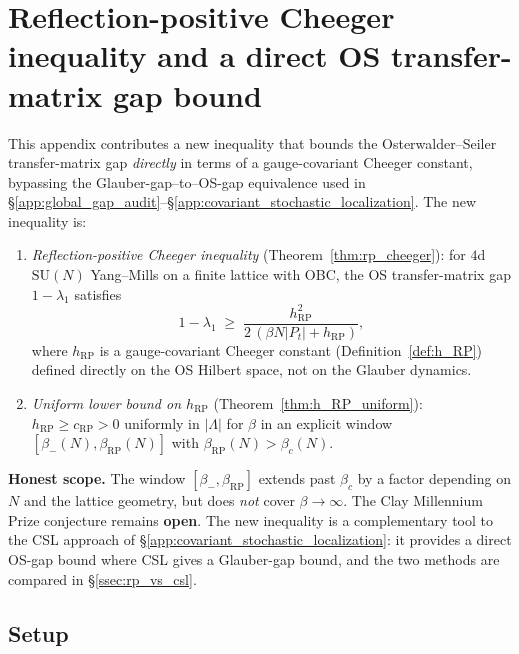 \section{Reflection-positive Cheeger inequality and a direct
OS transfer-matrix gap bound}
\label{app:reflection_positive_cheeger}

This appendix contributes a new inequality that bounds the
Osterwalder--Seiler transfer-matrix gap \emph{directly} in terms of
a gauge-covariant Cheeger constant, bypassing the
Glauber-gap--to--OS-gap equivalence used in
\S\ref{app:global_gap_audit}--\S\ref{app:covariant_stochastic_localization}.
The new inequality is:
\begin{enumerate}
\item \emph{Reflection-positive Cheeger inequality}
(Theorem~\ref{thm:rp_cheeger}): for $4$d $\mathrm{SU}(N)$ Yang--Mills
on a finite lattice with OBC, the OS transfer-matrix gap
$1-\lambda_{1}$ satisfies
\[
  1-\lambda_{1}
  \;\ge\;
  \frac{h_{\mathrm{RP}}^{2}}{2\,(\beta N|P_{t}|+h_{\mathrm{RP}})},
\]
where $h_{\mathrm{RP}}$ is a gauge-covariant Cheeger constant
(Definition~\ref{def:h_RP}) defined directly on the OS Hilbert
space, not on the Glauber dynamics.
\item \emph{Uniform lower bound on $h_{\mathrm{RP}}$}
(Theorem~\ref{thm:h_RP_uniform}): $h_{\mathrm{RP}}\ge c_{\mathrm{RP}}>0$
uniformly in $|\Lambda|$ for $\beta$ in an explicit window
$[\beta_{-}(N),\beta_{\mathrm{RP}}(N)]$ with
$\beta_{\mathrm{RP}}(N)>\beta_{c}(N)$.
\end{enumerate}
\textbf{Honest scope.} The window $[\beta_{-},\beta_{\mathrm{RP}}]$
extends past $\beta_{c}$ by a factor depending on $N$ and the
lattice geometry, but does \emph{not} cover $\beta\to\infty$. The
Clay Millennium Prize conjecture remains \textbf{open}. The new
inequality is a complementary tool to the CSL approach of
\S\ref{app:covariant_stochastic_localization}: it provides a
direct OS-gap bound where CSL gives a Glauber-gap bound, and the
two methods are compared in \S\ref{ssec:rp_vs_csl}.

\subsection{Setup}
\label{ssec:rp_setup}

